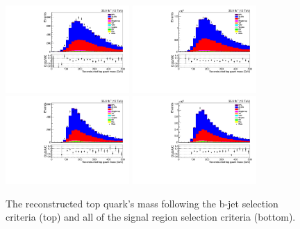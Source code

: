 \begin{figure}[ht]
\centering
\includegraphics[width=0.42\textwidth]{figs/background-estimation/plots/unblinded/prompt_ee_ttbarInc/topMass_NPL_ee_bTag_ee.pdf}
\includegraphics[width=0.42\textwidth]{figs/background-estimation/plots/unblinded/prompt_mumu_ttbarInc/topMass_NPL_mumu_bTag_mumu.pdf}
\\
\includegraphics[width=0.42\textwidth]{figs/background-estimation/plots/unblinded/prompt_ee_ttbarInc/topMass_NPL_ee_wMass_ee.pdf}
\includegraphics[width=0.42\textwidth]{figs/background-estimation/plots/unblinded/prompt_mumu_ttbarInc/topMass_NPL_mumu_wMass_mumu.pdf}
\caption{
The reconstructed top quark's mass following the b-jet selection criteria (top) and all of the signal region selection criteria (bottom).
}
\label{fig:SR_topMass}
\end{figure}

